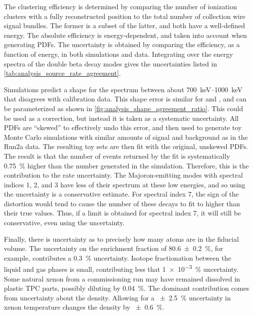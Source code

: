\documentclass[herrin-thesis.tex]{subfiles}
\begin{document}
The clustering efficiency is determined by comparing the number of ionization clusters with a fully reconstructed position to the total number of collection wire signal bundles. The former is a subset of the latter, and both have a well-defined energy. The absolute efficiency is energy-dependent, and taken into account when generating PDFs. The uncertainty is obtained by comparing the efficiency, as a function of energy, in both simulations and data. Integrating over the energy spectra of the double beta decay modes gives the uncertainties listed in \cref{tab:analysis_source_rate_agreement}.

Simulations predict a shape for the spectrum between about \SIrange{700}{1000}{\keV} that disagrees with calibration data. This shape error is similar for  and , and can be parameterized as shown in \cref{fig:analysis_shape_agreement_ratio}. This could be used as a correction, but instead it is taken as a systematic uncertainty. All PDFs are ``skewed'' to effectively undo this error, and then used to generate toy Monte Carlo simulations with similar amounts of signal and background as in the Run2a data. The resulting toy sets are then fit with the original, unskewed PDFs. The result is that the number of \twonu{} events returned by the fit is systematically \SI{0.75}{\percent} higher than the number generated in the simulation. Therefore, this is the contribution to the \twonu{} rate uncertainty. The Majoron-emitting modes with spectral indices 1, 2, and 3 have less of their spectrum at these low energies, and so using the \twonu{} uncertainty is a conservative estimate. For spectral index 7, the sign of the distortion would tend to cause the number of these decays to fit to higher than their true values. Thus, if a limit is obtained for spectral index 7, it will still be conservative, even using the \twonu{} uncertainty.

Finally, there is uncertainty as to precisely how many  atoms are in the fiducial volume. The uncertainty on the enrichment fraction of \SI{80.6\pm0.2}{\percent}, for example, contributes a \SI{0.3}{\percent} uncertainty. Isotope fractionation between the liquid and gas phases is small, contributing less that \SI{1e-3}{\percent} uncertainty. Some natural xenon from a commissioning run may have remained dissolved in plastic TPC parts, possibly diluting  by \SI{0.04}{\percent}. The dominant contribution comes from uncertainty about the density. Allowing for a \SI{\pm2.5}{\percent} uncertainty in xenon temperature changes the density by \SI{\pm0.6}{\percent}.
\end{document}
